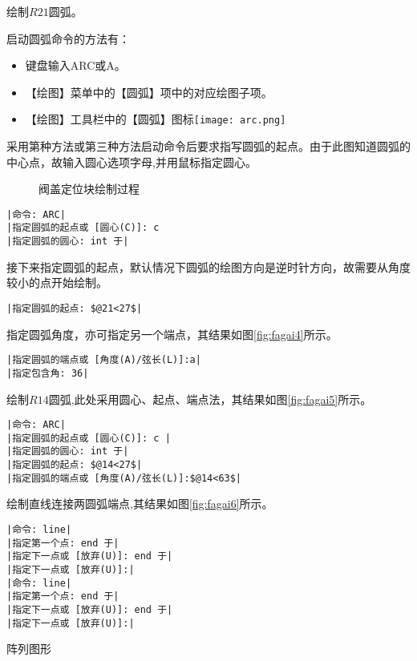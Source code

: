 \begin{procedure}
绘制$R21$圆弧。

启动圆弧命令的方法有：
\begin{itemize}
\item 键盘输入ARC或A。
\item 【绘图】菜单中的【圆弧】项中的对应绘图子项。
\item 【绘图】工具栏中的【圆弧】图标\texttt{[image: arc.png]}
\end{itemize}
采用第种方法或第三种方法启动命令后要求指写圆弧的起点。由于此图知道圆弧的中心点，故输入圆心选项字母,并用鼠标指定圆心。
\begin{figure}[htbp]
\centering
{}\hspace{30pt}
\hspace{30pt}
\caption{阀盖定位块绘制过程}
\end{figure}
\begin{lstlisting}
|命令: ARC|
|指定圆弧的起点或 [圆心(C)]: c 
|指定圆弧的圆心: int 于|
\end{lstlisting}
接下来指定圆弧的起点，默认情况下圆弧的绘图方向是逆时针方向，故需要从角度较小的点开始绘制。
\begin{lstlisting}
|指定圆弧的起点: $@21<27$|
\end{lstlisting}
指定圆弧角度，亦可指定另一个端点，其结果如图\ref{fig:fagai4}所示。
\begin{lstlisting}
|指定圆弧的端点或 [角度(A)/弦长(L)]:a|
|指定包含角: 36|
\end{lstlisting}
绘制$R14$圆弧,此处采用圆心、起点、端点法，其结果如图\ref{fig:fagai5}所示。
\begin{lstlisting}
|命令: ARC|
|指定圆弧的起点或 [圆心(C)]: c |
|指定圆弧的圆心: int 于|
|指定圆弧的起点: $@14<27$|
|指定圆弧的端点或 [角度(A)/弦长(L)]:$@14<63$|
\end{lstlisting}
绘制直线连接两圆弧端点,其结果如图\ref{fig:fagai6}所示。

\begin{lstlisting}
|命令: line|
|指定第一个点: end 于|
|指定下一点或 [放弃(U)]: end 于|
|指定下一点或 [放弃(U)]:|
|命令: line|
|指定第一个点: end 于|
|指定下一点或 [放弃(U)]: end 于|
|指定下一点或 [放弃(U)]:|
\end{lstlisting}
\item 阵列图形


\end{procedure}

